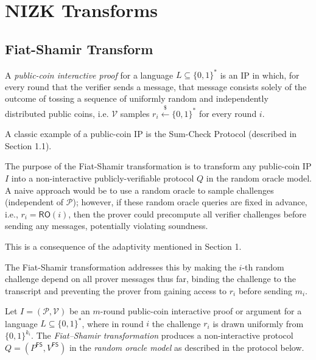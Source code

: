 \section{NIZK Transforms}

\subsection{Fiat-Shamir Transform}

\begin{definition}
A \emph{public-coin interactive proof} for a language $L \subseteq \{0,1\}^*$ is an IP in which, for every round that the verifier sends a message, that message consists solely of the outcome of tossing a sequence of uniformly random and independently distributed public coins, i.e. $\mathcal{V}$ samples $r_i \xleftarrow{\$} \{0,1\}^*$ for every round $i$. 
\end{definition}

\begin{example}
A classic example of a public-coin IP is the Sum-Check Protocol (described in Section 1.1).
\end{example}

\myspace

\noindent The purpose of the Fiat-Shamir transformation is to transform any public-coin IP $I$ into a non-interactive publicly-verifiable protocol $Q$ in the random oracle model. \\

\noindent A naive approach would be to use a random oracle to sample challenges (independent of $\mathcal{P}$); however, if these random oracle queries are fixed in advance, i.e., $r_i = \mathsf{RO}(i)$, then the prover could precompute all verifier challenges before sending any messages, potentially violating soundness.

\begin{remark}
This is a consequence of the adaptivity mentioned in Section 1.
\end{remark}

\noindent The Fiat-Shamir transformation addresses this by making the $i$-th random challenge depend on all prover messages thus far, binding the challenge to the transcript and preventing the prover from gaining access to $r_i$ before sending $m_i$.

\myspace

\begin{definition}\label{def:fiat_shamir}
Let $I = (\mathcal{P},\mathcal{V})$ be an $m$-round public-coin interactive proof or argument for a language $L \subseteq \{0,1\}^*$, where in round $i$ the challenge $r_i$ is drawn uniformly from $\{0,1\}^{k_i}$. The \emph{Fiat--Shamir transformation} produces a non-interactive protocol $Q = (P^{\mathsf{FS}},V^{\mathsf{FS}})$ in the \emph{random oracle model} as described in the protocol below.
\end{definition}

